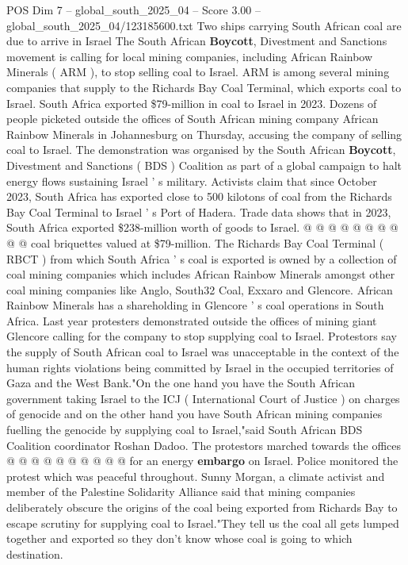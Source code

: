 \begin{textsample}{POS Dim 7 – global\_south\_2025\_04 – Score 3.00 – global\_south\_2025\_04/123185600.txt}  \label{ex:f7_pos_413}
Two ships carrying South African coal are due to arrive in Israel The South African \textbf{Boycott}, Divestment and Sanctions movement is calling for local mining companies, including African Rainbow Minerals ( ARM ), to stop selling coal to Israel.
ARM is among several mining companies that supply to the Richards Bay Coal Terminal, which exports coal to Israel.
South Africa exported \$79-million in coal to Israel in 2023.
Dozens of people picketed outside the offices of South African mining company African Rainbow Minerals in Johannesburg on Thursday, accusing the company of selling coal to Israel.
The demonstration was organised by the South African \textbf{Boycott}, Divestment and Sanctions ( BDS ) Coalition as part of a global campaign to halt energy flows sustaining Israel ' s military.
Activists claim that since October 2023, South Africa has exported close to 500 kilotons of coal from the Richards Bay Coal Terminal to Israel ' s Port of Hadera.
Trade data shows that in 2023, South Africa exported \$238-million worth of goods to Israel. @ @ @ @ @ @ @ @ @ @ coal briquettes valued at \$79-million.
The Richards Bay Coal Terminal ( RBCT ) from which South Africa ' s coal is exported is owned by a collection of coal mining companies which includes African Rainbow Minerals amongst other coal mining companies like Anglo, South32 Coal, Exxaro and Glencore.
African Rainbow Minerals has a shareholding in Glencore ' s coal operations in South Africa.
Last year protesters demonstrated outside the offices of mining giant Glencore calling for the company to stop supplying coal to Israel.
Protestors say the supply of South African coal to Israel was unacceptable in the context of the human rights violations being committed by Israel in the occupied territories of Gaza and the West Bank."On the one hand you have the South African government taking Israel to the ICJ ( International Court of Justice ) on charges of genocide and on the other hand you have South African mining companies fuelling the genocide by supplying coal to Israel,"said South African BDS Coalition coordinator Roshan Dadoo.
The protestors marched towards the offices @ @ @ @ @ @ @ @ @ @ for an energy \textbf{embargo} on Israel.
Police monitored the protest which was peaceful throughout.
Sunny Morgan, a climate activist and member of the Palestine Solidarity Alliance said that mining companies deliberately obscure the origins of the coal being exported from Richards Bay to escape scrutiny for supplying coal to Israel."They tell us the coal all gets lumped together and exported so they don't know whose coal is going to which destination.

\end{textsample}
